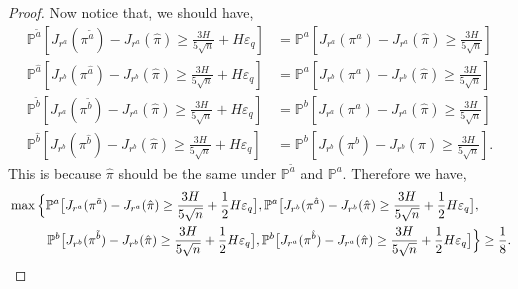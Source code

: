 \documentclass{article}
\begin{document}
\begin{proof}
Now notice that,  we should have,
\begin{align*}
    \mathbb P^{\tilde a}[J_{r^a}(\pi^{\tilde a})-J_{r^a}(\hat \pi)\geq \frac{3H}{5\sqrt n}+H\varepsilon_q]&=\mathbb P^a[J_{r^a}(\pi^a)-J_{r^a}(\hat \pi)\geq\frac {3H} {5\sqrt{n}}]\\
    \mathbb P^{\hat a}[J_{r^b}(\pi^{\hat a})-J_{r^b}(\hat \pi)\geq \frac{3H}{5\sqrt n}+H\varepsilon_q]&=\mathbb P^{a}[J_{r^b}(\pi^{a})-J_{r^b}(\hat \pi)\geq \frac{3H}{5\sqrt n}]\\
    \mathbb P^{\tilde b}[J_{r^a}(\pi^{\tilde b})-J_{r^a}(\hat \pi)\geq \frac{3H}{5\sqrt n}+H\varepsilon_q]&= \mathbb P^{b}[J_{r^a}(\pi^a)-J_{r^a}(\hat \pi)\ge \frac{3H}{5\sqrt n}]\\
    \mathbb P^{\hat b}[J_{r^b}(\pi^{\hat b})-J_{r^b}(\hat \pi)\geq \frac{3H}{5\sqrt n}+H\varepsilon_q]&= \mathbb P^{b}[J_{r^b}(\pi^b)-J_{r^b}(\hat \pi)\geq \frac{3H}{5\sqrt n}].
\end{align*}
This is because $\hat \pi$ should be the same under $\mathbb P^{\tilde a}$ and $\mathbb P^{a}$. Therefore we have,
\begin{align*}
    &\max\Big\{
\mathbb P^{a}\big[J_{r^{a}}(\pi^{\tilde a})-J_{r^{a}}(\hat\pi)\ge  \frac{3H}{5\sqrt n}+\frac{1}{2}H\varepsilon_q\big],
\mathbb P^{a}\big[J_{r^{b}}(\pi^{\hat a})-J_{r^{b}}(\hat\pi)\ge  \frac{3H}{5\sqrt n}+\frac{1}{2}H\varepsilon_q\big],\\
&\qquad\quad
\mathbb P^{b}\big[J_{r^{b}}(\pi^{\tilde b})-J_{r^{b}}(\hat\pi)\ge  \frac{3H}{5\sqrt n}+\frac{1}{2}H\varepsilon_q\big],
\mathbb P^{b}\big[J_{r^{a}}(\pi^{\hat b})-J_{r^{a}}(\hat\pi)\ge  \frac{3H}{5\sqrt n}+\frac{1}{2}H\varepsilon_q\big]
\Big\}\geq\frac{1}{8}. \qedhere
\end{align*}
\end{proof}
\end{document}
